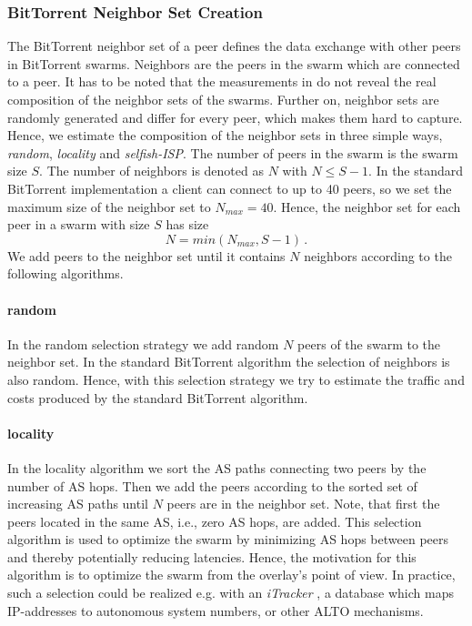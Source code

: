\subsubsection{BitTorrent Neighbor Set Creation}

The BitTorrent neighbor set of a peer defines the data exchange with other peers in BitTorrent swarms. Neighbors are the peers in the swarm which are connected to a peer. It has to be noted that the measurements in \cite{Hossfeld2011} do not reveal the real composition of the neighbor sets of the swarms. Further on, neighbor sets are randomly generated and differ for every peer, which makes them hard to capture. Hence, we estimate the composition of the neighbor sets in three simple ways, \textit{random}, \textit{locality} and \textit{selfish-ISP}.
The number of peers in the swarm is the swarm size $S$. The number of neighbors is denoted as $N$ with $N\leq S-1$. In the standard BitTorrent implementation a client can connect to up to 40 peers, so we set the maximum size of the neighbor set to $N_{max}=40$. Hence, the neighbor set for each peer in a swarm with size $S$ has size
\begin{equation}
N=min(N_{max},S-1) \, .
\end{equation}
We add peers to the neighbor set until it contains $N$ neighbors according to the following algorithms.
\paragraph{random}
In the random selection strategy we add random $N$ peers of the swarm to the neighbor set. In the standard BitTorrent algorithm the selection of neighbors is also random. Hence, with this selection strategy we try to estimate the traffic and costs produced by the standard BitTorrent algorithm.
\paragraph{locality}
In the locality algorithm we sort the AS paths connecting two peers by the number of AS hops. Then we add the peers according to the sorted set of increasing AS paths until $N$ peers are in the neighbor set. Note, that first the peers located in the same AS, i.e., zero AS hops, are added. This selection algorithm is used to optimize the swarm by minimizing AS hops between peers and thereby potentially reducing latencies. Hence, the motivation for this algorithm is to optimize the swarm from the overlay's point of view.
In practice, such a selection could be realized e.g. with an \emph{iTracker} \cite{Xie2008}, a database which maps IP-addresses to autonomous system numbers, or other ALTO mechanisms.
